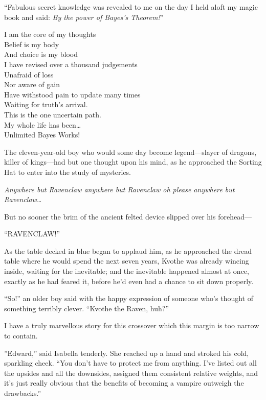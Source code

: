 \clearpage
{}
“Fabulous secret knowledge was revealed to me on the day I held aloft my magic book and said: \emph{By the power of Bayes’s Theorem!}”

\begin{emph}
I am the core of my thoughts\\
Belief is my body\\
And choice is my blood\\
I have revised over a thousand judgements\\
Unafraid of loss\\
Nor aware of gain\\
Have withstood pain to update many times\\
Waiting for truth’s arrival.\\
This is the one uncertain path.\\
My whole life has been…\\
Unlimited Bayes Works!
\end{emph}

The eleven-year-old boy who would some day become legend—slayer of dragons, killer of kings—had but one thought upon his mind, as he approached the Sorting Hat to enter into the study of mysteries.

\emph{Anywhere but Ravenclaw anywhere but Ravenclaw oh please anywhere but Ravenclaw…}

But no sooner the brim of the ancient felted device slipped over his forehead—

“RAVENCLAW!”

As the table decked in blue began to applaud him, as he approached the dread table where he would spend the next seven years, Kvothe was already wincing inside, waiting for the inevitable; and the inevitable happened almost at once, exactly as he had feared it, before he’d even had a chance to sit down properly.

“So!” an older boy said with the happy expression of someone who’s thought of something terribly clever. “Kvothe the Raven, huh?”

I have a truly marvellous story for this crossover which this margin is too narrow to contain.

”Edward,” said Isabella tenderly. She reached up a hand and stroked his cold, sparkling cheek. “You don’t have to protect me from anything. I’ve listed out all the upsides and all the downsides, assigned them consistent relative weights, and it’s just really obvious that the benefits of becoming a vampire outweigh the drawbacks.”

